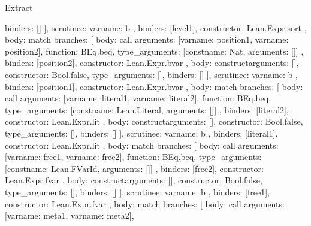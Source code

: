 \begin{lexlean}{Extract}
\begin{toolingmodule}
{{{{{{                  binders: []
                }
              ],
              scrutinee: var{name: b}
            },
            binders: [level1],
            constructor: Lean.Expr.sort
          },
          {
            body: match{
              branches: [
                {
                  body: call{
                    arguments: [var{name: position1}, var{name: position2}],
                    function: BEq.beq,
                    type_arguments: [const{name: Nat, arguments: []}]
                  },
                  binders: [position2],
                  constructor: Lean.Expr.bvar
                },
                {
                  body: construct{arguments: [], constructor: Bool.false, type_arguments: []},
                  binders: []
                }
              ],
              scrutinee: var{name: b}
            },
            binders: [position1],
            constructor: Lean.Expr.bvar
          },
          {
            body: match{
              branches: [
                {
                  body: call{
                    arguments: [var{name: literal1}, var{name: literal2}],
                    function: BEq.beq,
                    type_arguments: [const{name: Lean.Literal, arguments: []}]
                  },
                  binders: [literal2],
                  constructor: Lean.Expr.lit
                },
                {
                  body: construct{arguments: [], constructor: Bool.false, type_arguments: []},
                  binders: []
                }
              ],
              scrutinee: var{name: b}
            },
            binders: [literal1],
            constructor: Lean.Expr.lit
          },
          {
            body: match{
              branches: [
                {
                  body: call{
                    arguments: [var{name: free1}, var{name: free2}],
                    function: BEq.beq,
                    type_arguments: [const{name: Lean.FVarId, arguments: []}]
                  },
                  binders: [free2],
                  constructor: Lean.Expr.fvar
                },
                {
                  body: construct{arguments: [], constructor: Bool.false, type_arguments: []},
                  binders: []
                }
              ],
              scrutinee: var{name: b}
            },
            binders: [free1],
            constructor: Lean.Expr.fvar
          },
          {
            body: match{
              branches: [
                {
                  body: call{
                    arguments: [var{name: meta1}, var{name: meta2}],
}}}}}}}
\end{toolingmodule}
\end{lexlean}

